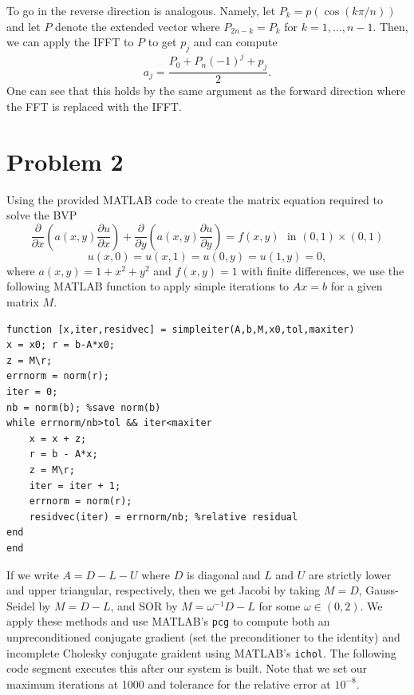 \documentclass{article}
\begin{document}
To go in the reverse direction is analogous. Namely, let $P_k=p ( \cos ( k \pi / n ) )$ and let $P$ denote the extended vector where $P_{2n-k}=P_k$ for $k=1,\ldots,n-1$. Then, we can apply the IFFT to $P$ to get $p_j$ and can compute 
\[
a_j=\frac{P_0+P_n(-1)^j+p_j}{2}.
\]
One can see that this holds by the same argument as the forward direction where the FFT is replaced with the IFFT. %


\section{Problem 2}
Using the provided MATLAB code to create the matrix equation required to solve the BVP \[
\frac{\partial}{\partial x} \left( a(x,y) \frac{\partial u}{\partial x}
\right) +
\frac{\partial}{\partial y} \left( a(x,y) \frac{\partial u}{\partial y}
\right) = f(x,y)~~~\mbox{in } (0,1) \times (0,1)
\]
\[
u(x,0) = u(x,1) = u(0,y) = u(1,y) = 0 ,
\]
where $a(x,y) = 1 + x^2 + y^2$ and $f(x,y) = 1$ with finite differences, we use the following MATLAB function to apply simple iterations to $Ax=b$ for a given matrix $M$.
\begin{verbatim}
function [x,iter,residvec] = simpleiter(A,b,M,x0,tol,maxiter)
x = x0; r = b-A*x0;
z = M\r;
errnorm = norm(r);
iter = 0;
nb = norm(b); %save norm(b)
while errnorm/nb>tol && iter<maxiter
    x = x + z;
    r = b - A*x;
    z = M\r;
    iter = iter + 1;
    errnorm = norm(r);
    residvec(iter) = errnorm/nb; %relative residual
end
end
\end{verbatim}
If we write $A=D-L-U$ where $D$ is diagonal and $L$ and $U$ are strictly lower and upper triangular, respectively, then we get Jacobi by taking $M=D$, Gauss-Seidel by $M=D-L$, and SOR by $M=\omega^{-1}D-L$ for some $\omega\in(0,2)$. We apply these methods and use MATLAB's \verb+pcg+ to compute both an unpreconditioned conjugate gradient (set the preconditioner to the identity) and incomplete Cholesky conjugate graident using MATLAB's \verb+ichol+. The following code segment executes this after our system is built. Note that we set our maximum iterations at 1000 and tolerance for the relative error at $10^{-8}$.
\end{document}
